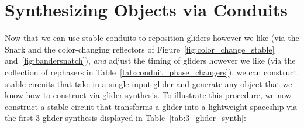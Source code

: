 \section{Synthesizing Objects via Conduits}\label{sec:other_converters}

Now that we can use stable conduits to reposition gliders however we like (via the Snark and the color-changing reflectors of Figure~\ref{fig:color_change_stable} and~\ref{fig:bandersnatch}), \emph{and} adjust the timing of gliders however we like (via the collection of rephasers in Table~\ref{tab:conduit_phase_changers}), we can construct stable circuits that take in a single input glider and generate any object that we know how to construct via glider synthesis. To illustrate this procedure, we now construct a stable circuit that transforms a glider into a lightweight spaceship via the first $3$-glider synthesis displayed in Table~\ref{tab:3_glider_synth}:\smallskip

